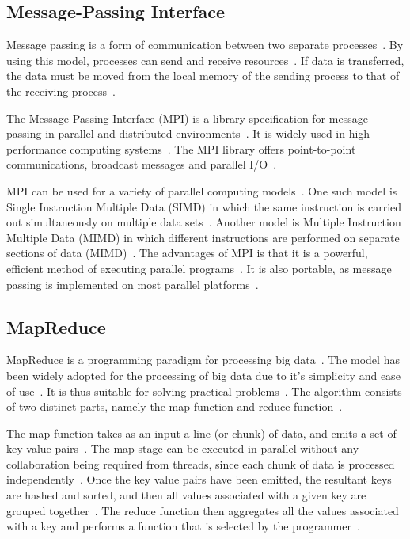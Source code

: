 \documentclass[10pt,twocolumn]{witseiepaper}
\begin{document}
\subsection{Message-Passing Interface}
Message passing is a form of communication between two separate processes~\cite{IBM, equijoinWithMPI}. By using this model, processes can send and receive resources~\cite{IBM}. If data is transferred, the data must be moved from the local memory of the sending process to that of the receiving process~\cite{IBM}.

The Message-Passing Interface (MPI) is a library specification for message passing in parallel and distributed environments~\cite{comparingMPIMapReduce}. It is widely used in high-performance computing systems~\cite{equijoinWithMPI, joinOnCluster}. The MPI library offers point-to-point communications, broadcast messages and parallel I/O~\cite{comparingMPIMapReduce}.

MPI can be used for a variety of parallel computing models~\cite{comparingMPIMapReduce}. One such model is Single Instruction Multiple Data (SIMD) in which the same instruction is carried out simultaneously on multiple data sets~\cite{comparingMPIMapReduce}. Another model is Multiple Instruction Multiple Data (MIMD) in which different instructions are performed on separate sections of data (MIMD)~\cite{comparingMPIMapReduce}. The advantages of MPI is that it is a powerful, efficient method of executing parallel programs~\cite{IBM}. It is also portable, as message passing is implemented on most parallel platforms~\cite{IBM}.

\subsection{MapReduce}

MapReduce is a programming paradigm for processing big data~\cite{comparingMPIMapReduce}. The model has been widely adopted for the processing of big data due to it's simplicity and ease of use~\cite{comparingMPIMapReduce}. It is thus suitable for solving practical problems~\cite{comparingMPIMapReduce, mapReduceJoin}. The algorithm consists of two distinct parts, namely the map function and reduce function~\cite{phoenix}. 

The map function takes as an input a line (or chunk) of data, and emits a set of key-value pairs~\cite{phoenix}. The map stage can be executed in parallel without any collaboration being required from threads, since each chunk of data is processed independently~\cite{comparingMPIMapReduce}. Once the key value pairs have been emitted, the resultant keys are hashed and sorted, and then all values associated with a given key are grouped together~\cite{phoenix}. The reduce function then aggregates all the values associated with a key and performs a function that is selected by the programmer~\cite{comparingMPIMapReduce}.
\end{document}
